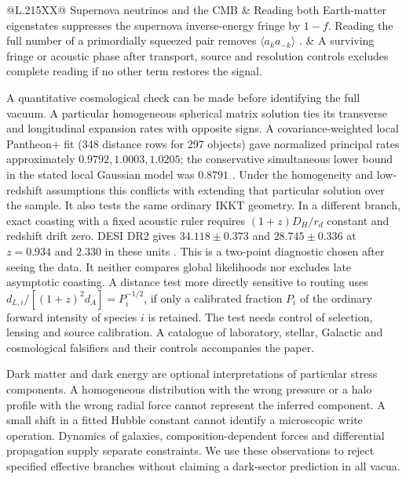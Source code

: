 \begin{table}[!tb]
\begin{tabularx}{\linewidth}{@{}L{.215\linewidth}XX@{}}
Supernova neutrinos and the CMB & Reading both Earth-matter eigenstates suppresses the supernova inverse-energy fringe by \(1-f\). Reading the full number of a primordially squeezed pair removes \(\langle a_k a_{-k}\rangle\) \cite{neutrino,acoustic}. & A surviving fringe or acoustic phase after transport, source and resolution controls excludes complete reading if no other term restores the signal.\\
\bottomrule\end{tabularx}
\end{table}

A quantitative cosmological check can be made before identifying the full vacuum. A particular homogeneous spherical matrix solution ties its transverse and longitudinal expansion rates with opposite signs. A covariance-weighted local Pantheon+ fit (348 distance rows for 297 objects) gave normalized principal rates approximately \(0.9792,1.0003,1.0205\); the conservative simultaneous lower bound in the stated local Gaussian model was \(0.8791\) \cite{pantheon}. Under the homogeneity and low-redshift assumptions this conflicts with extending that particular solution over the sample. It also tests the same ordinary IKKT geometry. In a different branch, exact coasting with a fixed acoustic ruler requires \((1+z)D_H/r_d\) constant and redshift drift zero. DESI DR2 gives \(34.118\pm0.373\) and \(28.745\pm0.336\) at \(z=0.934\) and \(2.330\) in these units \cite{desi}. This is a two-point diagnostic chosen after seeing the data. It neither compares global likelihoods nor excludes late asymptotic coasting. A distance test more directly sensitive to routing uses \(d_{L,i}/[(1+z)^2d_A]=P_i^{-1/2}\), if only a calibrated fraction \(P_i\) of the ordinary forward intensity of species \(i\) is retained. The test needs control of selection, lensing and source calibration. A catalogue of laboratory, stellar, Galactic and cosmological falsifiers and their controls accompanies the paper.

Dark matter and dark energy are optional interpretations of particular stress components. A homogeneous distribution with the wrong pressure or a halo profile with the wrong radial force cannot represent the inferred component. A small shift in a fitted Hubble constant cannot identify a microscopic write operation. Dynamics of galaxies, composition-dependent forces and differential propagation supply separate constraints. We use these observations to reject specified effective branches without claiming a dark-sector prediction in all vacua.


